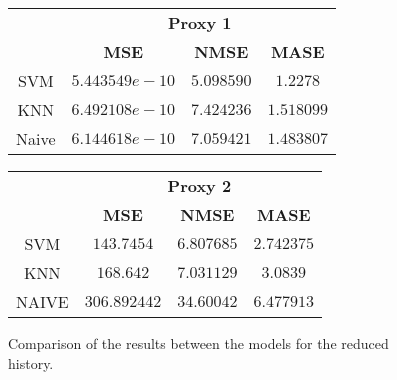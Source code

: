 \begin{figure}[!h]
\centering
\begin{minipage}{\textwidth}
\begin{minipage}{0.5\textwidth}
\begin{center}
\vskip10pt
   \begin{footnotesize}
   \begin{tabular}{|c|c|c|c|}
   \hline
   & \multicolumn{3}{|c|}{\textbf{Proxy 1}} \\ \cline{2-4}
   & \textbf{MSE}  & \textbf{NMSE} & \textbf{MASE}          \\ \hline
   SVM  & $5.443549e-10$ &$5.098590$& $1.2278$         \\ 
   KNN & $6.492108e-10$ &$7.424236$& $1.518099$ \\ 
   Naive & $6.144618e-10$ &$7.059421$& $1.483807$     \\ 
   \hline
   \end{tabular}
   \end{footnotesize}
\end{center}
\end{minipage}
\begin{minipage}{0.5\textwidth}
\begin{center}
\vskip12pt
   \begin{footnotesize}
   \begin{tabular}{|c|c|c|c|}
   \hline
   & \multicolumn{3}{|c|}{\textbf{Proxy 2}} \\ \cline{2-4}
   & \textbf{MSE}  & \textbf{NMSE} & \textbf{MASE}          \\ \hline
   SVM  & $143.7454$      &$6.807685$& $2.742375$         \\ 
   KNN & $168.642$     &$7.031129$& $3.0839$ \\ 
   NAIVE & $306.892442$ &$34.60042$& $6.477913$      \\ 
   \hline
   \end{tabular}
   \end{footnotesize}
\end{center}
\end{minipage}
\end{minipage}
\caption{Comparison of the results between the models for the reduced history.}
\label{fig:compare6m}
\end{figure}